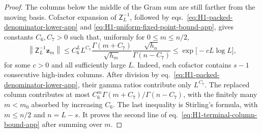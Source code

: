 \documentclass[a4paper,11pt]{article}
\theoremstyle{definition}
\theoremstyle{remark}
\begin{document}
\begin{proof}
The columns below the middle of the Gram sum are still farther from the
moving basis. Cofactor expansion of \(\mathsf Z_L^{-1}\), followed by
eqs.~\eqref{eq:H1-packed-denominator-lower-app} and
\eqref{eq:H1-uniform-fixed-point-bound-app}, gives constants
\(C_6,C_7>0\) such that, uniformly for \(0\le m\le n/2\),
\begin{equation}
   \left\|\mathsf Z_L^{-1}\mathbf z_m\right\|
   \le
   C_6^L L^{C_7}
   \frac{\Gamma(m+C_7)}{\sqrt{h_m}}
   \frac{\sqrt{h_n}}{\Gamma(n-C_7)}
   \le \exp\bigl[-cL\log L\bigr],
   \label{eq:H1-old-column-Stirling-app}
\end{equation}
for some \(c>0\) and all sufficiently large \(L\).
Indeed, each cofactor contains \(s-1\) consecutive high-index columns.
After division by eq.~\eqref{eq:H1-packed-denominator-lower-app}, their
gamma ratios contribute only \(L^{C_7}\). The replaced column contributes
at most \(C_6^m\Gamma(m+C_7)/\Gamma(n-C_7)\), with the finitely many
\(m<m_0\) absorbed by increasing \(C_6\).
The last inequality is Stirling's formula, with \(m\le n/2\) and
\(n=L-s\). It proves the
second line of eq.~\eqref{eq:H1-terminal-column-bound-app} after summing
over \(m\).


\end{proof}
\end{document}
